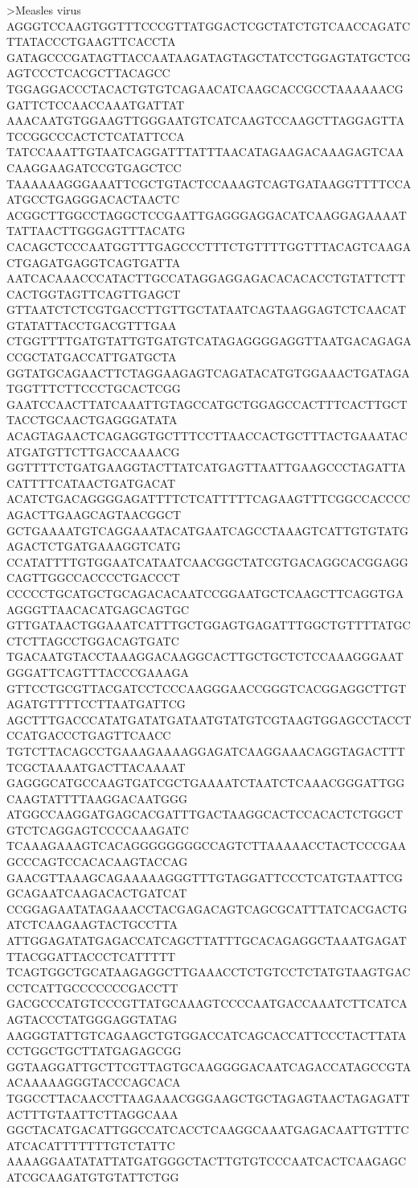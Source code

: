 >Measles virus
AGGGTCCAAGTGGTTTCCCGTTATGGACTCGCTATCTGTCAACCAGATCTTATACCCTGAAGTTCACCTA
GATAGCCCGATAGTTACCAATAAGATAGTAGCTATCCTGGAGTATGCTCGAGTCCCTCACGCTTACAGCC
TGGAGGACCCTACACTGTGTCAGAACATCAAGCACCGCCTAAAAAACGGATTCTCCAACCAAATGATTAT
AAACAATGTGGAAGTTGGGAATGTCATCAAGTCCAAGCTTAGGAGTTATCCGGCCCACTCTCATATTCCA
TATCCAAATTGTAATCAGGATTTATTTAACATAGAAGACAAAGAGTCAACAAGGAAGATCCGTGAGCTCC
TAAAAAAGGGAAATTCGCTGTACTCCAAAGTCAGTGATAAGGTTTTCCAATGCCTGAGGGACACTAACTC
ACGGCTTGGCCTAGGCTCCGAATTGAGGGAGGACATCAAGGAGAAAATTATTAACTTGGGAGTTTACATG
CACAGCTCCCAATGGTTTGAGCCCTTTCTGTTTTGGTTTACAGTCAAGACTGAGATGAGGTCAGTGATTA
AATCACAAACCCATACTTGCCATAGGAGGAGACACACACCTGTATTCTTCACTGGTAGTTCAGTTGAGCT
GTTAATCTCTCGTGACCTTGTTGCTATAATCAGTAAGGAGTCTCAACATGTATATTACCTGACGTTTGAA
CTGGTTTTGATGTATTGTGATGTCATAGAGGGGAGGTTAATGACAGAGACCGCTATGACCATTGATGCTA
GGTATGCAGAACTTCTAGGAAGAGTCAGATACATGTGGAAACTGATAGATGGTTTCTTCCCTGCACTCGG
GAATCCAACTTATCAAATTGTAGCCATGCTGGAGCCACTTTCACTTGCTTACCTGCAACTGAGGGATATA
ACAGTAGAACTCAGAGGTGCTTTCCTTAACCACTGCTTTACTGAAATACATGATGTTCTTGACCAAAACG
GGTTTTCTGATGAAGGTACTTATCATGAGTTAATTGAAGCCCTAGATTACATTTTCATAACTGATGACAT
ACATCTGACAGGGGAGATTTTCTCATTTTTCAGAAGTTTCGGCCACCCCAGACTTGAAGCAGTAACGGCT
GCTGAAAATGTCAGGAAATACATGAATCAGCCTAAAGTCATTGTGTATGAGACTCTGATGAAAGGTCATG
CCATATTTTGTGGAATCATAATCAACGGCTATCGTGACAGGCACGGAGGCAGTTGGCCACCCCTGACCCT
CCCCCTGCATGCTGCAGACACAATCCGGAATGCTCAAGCTTCAGGTGAAGGGTTAACACATGAGCAGTGC
GTTGATAACTGGAAATCATTTGCTGGAGTGAGATTTGGCTGTTTTATGCCTCTTAGCCTGGACAGTGATC
TGACAATGTACCTAAAGGACAAGGCACTTGCTGCTCTCCAAAGGGAATGGGATTCAGTTTACCCGAAAGA
GTTCCTGCGTTACGATCCTCCCAAGGGAACCGGGTCACGGAGGCTTGTAGATGTTTTCCTTAATGATTCG
AGCTTTGACCCATATGATATGATAATGTATGTCGTAAGTGGAGCCTACCTCCATGACCCTGAGTTCAACC
TGTCTTACAGCCTGAAAGAAAAGGAGATCAAGGAAACAGGTAGACTTTTCGCTAAAATGACTTACAAAAT
GAGGGCATGCCAAGTGATCGCTGAAAATCTAATCTCAAACGGGATTGGCAAGTATTTTAAGGACAATGGG
ATGGCCAAGGATGAGCACGATTTGACTAAGGCACTCCACACTCTGGCTGTCTCAGGAGTCCCCAAAGATC
TCAAAGAAAGTCACAGGGGGGGGCCAGTCTTAAAAACCTACTCCCGAAGCCCAGTCCACACAAGTACCAG
GAACGTTAAAGCAGAAAAAGGGTTTGTAGGATTCCCTCATGTAATTCGGCAGAATCAAGACACTGATCAT
CCGGAGAATATAGAAACCTACGAGACAGTCAGCGCATTTATCACGACTGATCTCAAGAAGTACTGCCTTA
ATTGGAGATATGAGACCATCAGCTTATTTGCACAGAGGCTAAATGAGATTTACGGATTACCCTCATTTTT
TCAGTGGCTGCATAAGAGGCTTGAAACCTCTGTCCTCTATGTAAGTGACCCTCATTGCCCCCCCGACCTT
GACGCCCATGTCCCGTTATGCAAAGTCCCCAATGACCAAATCTTCATCAAGTACCCTATGGGAGGTATAG
AAGGGTATTGTCAGAAGCTGTGGACCATCAGCACCATTCCCTACTTATACCTGGCTGCTTATGAGAGCGG
GGTAAGGATTGCTTCGTTAGTGCAAGGGGACAATCAGACCATAGCCGTAACAAAAAGGGTACCCAGCACA
TGGCCTTACAACCTTAAGAAACGGGAAGCTGCTAGAGTAACTAGAGATTACTTTGTAATTCTTAGGCAAA
GGCTACATGACATTGGCCATCACCTCAAGGCAAATGAGACAATTGTTTCATCACATTTTTTTGTCTATTC
AAAAGGAATATATTATGATGGGCTACTTGTGTCCCAATCACTCAAGAGCATCGCAAGATGTGTATTCTGG
